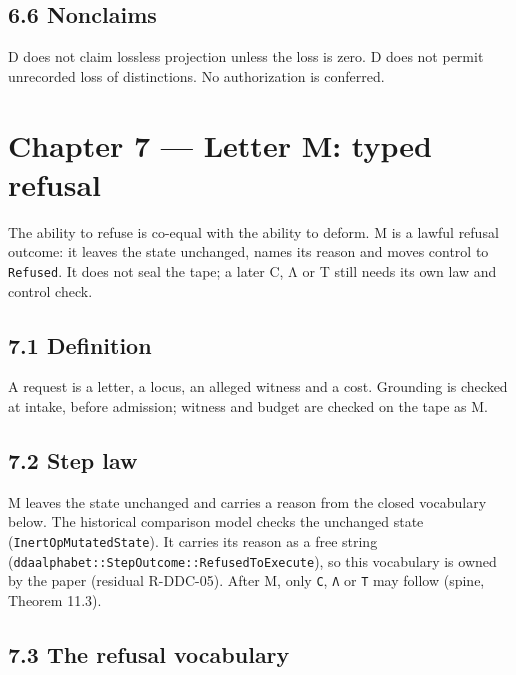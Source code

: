 \documentclass[
  11pt,
]{article}
\newenvironment{Shaded}{}{}
\newcommand{\NormalTok}[1]{#1}
\renewcommand{\_}{\ddcunderscore\allowbreak}
\begin{document}
\subsection{6.6 Nonclaims}\label{nonclaims-5}

\begin{Shaded}
\begin{Highlighting}[]
\NormalTok{D does not claim lossless projection unless the loss is zero.}
\NormalTok{D does not permit unrecorded loss of distinctions. No authorization is conferred.}
\end{Highlighting}
\end{Shaded}

\section{Chapter 7 --- Letter M: typed refusal}\label{chapter-7}

The ability to refuse is co-equal with the ability to deform. M is a
lawful refusal outcome: it leaves the state unchanged, names its reason
and moves control to \texttt{Refused}. It does not seal the tape; a
later C, Λ or T still needs its own law and control check.

\subsection{7.1 Definition}\label{definition-7}

A request is a letter, a locus, an alleged witness and a cost. Grounding
is checked at intake, before admission; witness and budget are checked
on the tape as M.

\subsection{7.2 Step law}\label{step-law-6}

M leaves the state unchanged and carries a reason from the closed
vocabulary below. The historical comparison model checks the unchanged
state (\texttt{Inert\allowbreak Op\allowbreak Mutated\allowbreak State}). It carries its reason as a free
string (\texttt{dda\_alphabet::Step\allowbreak Outcome::Refused\allowbreak To\allowbreak Execute}), so this
vocabulary is owned by the paper (residual R-DDC-05). After M, only
\texttt{C}, \texttt{Λ} or \texttt{T} may follow (spine, Theorem 11.3).

\subsection{7.3 The refusal vocabulary}\label{the-refusal-vocabulary}
\end{document}
